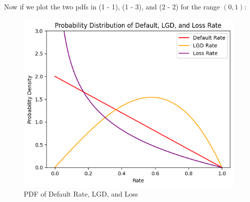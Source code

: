 \documentclass[11pt]{article}
\begin{document}
\newpage

Now if we plot the two pdfs in (1 - 1), (1 - 3), and (2 - 2) 
for the range $(0, 1)$:

\begin{figure}[h]
\centering
\includegraphics[scale=0.8]{Q2.png}
\caption{PDF of Default Rate, LGD, and Loss}
\label{Fig:Q2}
\end{figure}
\end{document}
